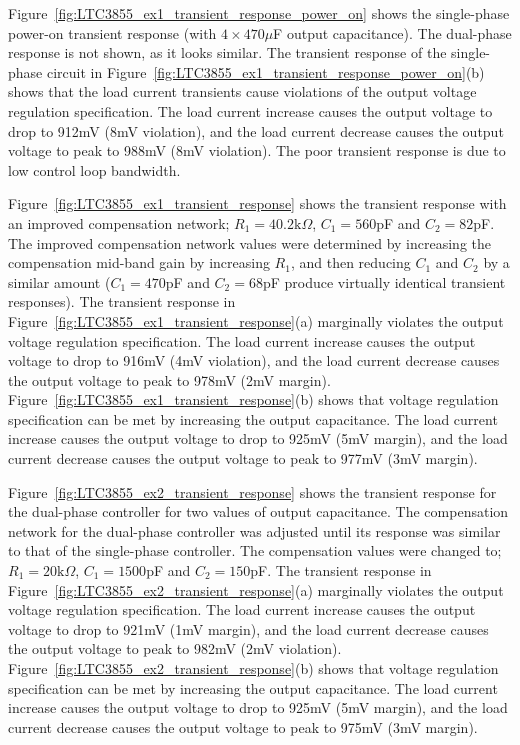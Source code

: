 Figure~\ref{fig:LTC3855_ex1_transient_response_power_on} shows
the single-phase power-on transient response (with $4\times470\mu$F
output capacitance). The dual-phase response is not shown, as it
looks similar. The transient response of the single-phase circuit in
Figure~\ref{fig:LTC3855_ex1_transient_response_power_on}(b) shows
that the load current transients cause violations of the output 
voltage regulation specification.
The load current increase causes the output voltage to drop to 
912mV (8mV violation), and the load current decrease causes the
output voltage to peak to 988mV (8mV violation).
The poor transient response is due to low control loop bandwidth.

Figure~\ref{fig:LTC3855_ex1_transient_response} shows the transient
response with an improved compensation network; $R_1 = 40.2\text{k}\Omega$,
$C_1 = 560$pF and $C_2 = 82$pF. The improved compensation network
values were determined by increasing the compensation mid-band gain
by increasing $R_1$, and then reducing $C_1$ and $C_2$ by a similar
amount ($C_1 = 470$pF and $C_2 = 68$pF produce virtually identical
transient responses).
The transient response in Figure~\ref{fig:LTC3855_ex1_transient_response}(a)
marginally violates the output voltage regulation specification.
The load current increase causes the output voltage to drop to 
916mV (4mV violation), and the load current decrease causes the
output voltage to peak to 978mV (2mV margin).
%
Figure~\ref{fig:LTC3855_ex1_transient_response}(b) shows that voltage
regulation specification can be met by increasing the output capacitance.
The load current increase causes the output voltage to drop to 
925mV (5mV margin), and the load current decrease causes the
output voltage to peak to 977mV (3mV margin).

Figure~\ref{fig:LTC3855_ex2_transient_response} shows the transient
response for the dual-phase controller for two values of output
capacitance. The compensation network for the dual-phase controller
was adjusted until its response was similar to that of the
single-phase controller. The compensation values were changed
to; $R_1 = 20\text{k}\Omega$, $C_1 = 1500$pF and $C_2 = 150$pF.
%
The transient response in Figure~\ref{fig:LTC3855_ex2_transient_response}(a)
marginally violates the output voltage regulation specification.
The load current increase causes the output voltage to drop to 
921mV (1mV margin), and the load current decrease causes the
output voltage to peak to 982mV (2mV violation).
%
Figure~\ref{fig:LTC3855_ex2_transient_response}(b) shows that voltage
regulation specification can be met by increasing the output capacitance.
The load current increase causes the output voltage to drop to 
925mV (5mV margin), and the load current decrease causes the
output voltage to peak to 975mV (3mV margin).

